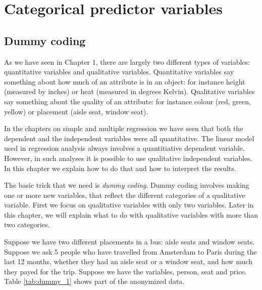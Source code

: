 \chapter{Categorical predictor variables}



\section{Dummy coding}
As we have seen in Chapter 1, there are largely two different types of variables: quantitative variables and qualitative variables. Quantitative variables say something about how much of an attribute is in an object: for instance height (measured by inches) or heat (measured in degrees Kelvin). Qualitative variables say something about the quality of an attribute: for instance colour (red, green, yellow) or placement (aisle seat, window seat).

In the chapters on simple and multiple regression we have seen that both the dependent and the independent variables were all quantitative. The linear model used in regression analysis always involves a quantitiative dependent variable. However, in such analyses it is possible to use qualitative independent variables. In this chapter we explain how to do that and how to interpret the results. 

The basic trick that we need is \textit{dummy coding}. Dummy coding involves making one or more new variables, that reflect the different categories of a qualitative variable. First we focus on qualitative variables with only two variables. Later in this chapter, we will explain what to do with qualitative variables with more than two categories. 

Suppose we have two different placements in a bus: aisle seats and window seats. Suppose we ask 5 people who have travelled from Amsterdam to Paris during the last 12 months, whether they had an aisle seat or a window seat, and how much they payed for the trip. Suppose we have the variables, person, seat and price. Table \ref{tab:dummy_1} shows part of the anonymized data.

\begin{kframe}


{\ttfamily\noindent\bfseries{}}

{\ttfamily\noindent\bfseries\color{errorcolor}{\#\# Error in data.frame(person, seat, price): object 'price' not found}}

{\ttfamily\noindent\bfseries{}}\end{kframe}


